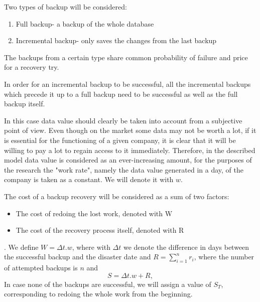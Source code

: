 \documentclass[11pt, a4paper]{article}
\theoremstyle{definition}
\begin{document}
		Two types of backup will be considered:
		\begin{enumerate}
			\item Full backup- a backup of the whole database
			\item Incremental backup- only saves the changes from the last backup
		\end{enumerate}
		The backups from a certain type share common probability of failure and price for a recovery try.\par
		In order for an incremental backup to be successful, all the incremental backups which precede it up to a full backup need to be successful as well as the full backup itself.\par
		In this case data value should clearly be taken into account from a subjective point of view. Even though on the market some data may not be worth a lot, if it is essential for the functioning of a given company, it is clear that it will be willing to pay a lot to regain access to it immediately. Therefore, in the described model data value is considered as an ever-increasing amount, for the purposes of the research the "work rate", namely the data value generated in a day, of the company is taken as a constant. We will denote it with $w$.\par
		The cost of a backup recovery will be considered as a sum of two factors:
		\begin{itemize}
			\item The cost of redoing the lost work, denoted with W
			\item The cost of the recovery process itself, denoted with R
		\end{itemize}.
		We define $W = \Delta t.w$, where with $\Delta t$ we denote the difference in days between the successful backup and the disaster date and $R = \sum_{i=1}^{n} r_i$, where the number of attempted backups is $n$ and 
		$$
		S=\Delta t.w + R,
		$$
		In case none of the backups are successful, we will assign a value of $S_T$, corresponding to redoing the whole work from the beginning.\par
\end{document}
